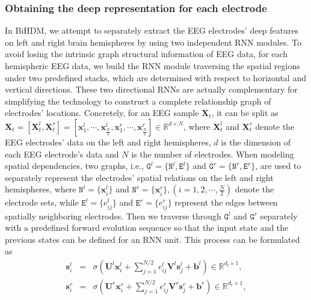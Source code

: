 \documentclass[journal]{IEEEtran}
\begin{document}
\subsubsection{Obtaining the deep representation for each electrode}

In BiHDM, we attempt to separately extract the EEG electrodes' deep features on left and right brain hemispheres by using two independent RNN modules. To avoid losing the intrinsic graph structural information of EEG data, for each hemispheric EEG data, we build the RNN module traversing the spatial regions under two predefined stacks, which are determined with respect to horizontal and vertical directions. These two directional RNNs are actually complementary for simplifying the technology to construct a complete relationship graph of electrodes' locations. Concretely, for an EEG sample $\mathbf{X}_t$, it can be split as $\mathbf{X}_t \!=\! [\mathbf{X}_t^l, \mathbf{X}_t^r] \!=\! [\mathbf{x}^l_1,\cdots,\mathbf{x}^l_{\frac{N}{2}}, \mathbf{x}^r_1,\cdots,\mathbf{x}^r_{\frac{N}{2}} ] \!\in\! \mathbb{R}^{d \times N}$, where $\mathbf{X}_t^l$ and $\mathbf{X}_t^r$ denote the EEG electrodes' data on the left and right hemispheres, $d$ is the dimension of each EEG electrode's data and $N$ is the number of electrodes. When modeling spatial dependencies, two graphs, i.e., $\texttt{G}^l \!\!=\!\! \{\texttt{N}^l, \texttt{E}^l\}$ and $\texttt{G}^r \!=\! \{\texttt{N}^r, \texttt{E}^r\}$, are used to separately represent the electrodes' spatial relations on the left and right hemispheres, where $\texttt{N}^l \!=\! \{\mathbf{x}^l_{i}\}$ and $\texttt{N}^r \!=\! \{\mathbf{x}^r_{i}\}, (i \!=\!1,2,\cdots,\frac{N}{2})$ denote the electrode sets, while $\texttt{E}^l \!=\! \{e^l_{ij}\}$ and $\texttt{E}^r \!=\! \{e^r_{ij}\}$ represent the edges between spatially neighboring electrodes. Then we traverse through $\texttt{G}^l$ and $\texttt{G}^r$ separately with a predefined forward evolution sequence so that the input state and the previous states can be defined for an RNN unit. This process can be formulated as
\begin{eqnarray}
\mathbf{s}^l_i \!\!\!\!&=&\!\!\!\! \sigma(\mathbf{U}^l\mathbf{x}^l_i +  \sum\nolimits_{j=1}^{N/2} e^l_{ij}\mathbf{V}^l \mathbf{s}^l_j + \mathbf{b}^l) \in \mathbb{R}^{d_l \times 1}, \\
\mathbf{s}^r_i \!\!\!\!&=&\!\!\!\! \sigma(\mathbf{U}^r\mathbf{x}^r_i +  \sum\nolimits_{j=1}^{N/2} e^r_{ij}\mathbf{V}^r \mathbf{s}^r_j + \mathbf{b}^r) \in \mathbb{R}^{d_r \times 1}, 
\end{eqnarray}
\end{document}
